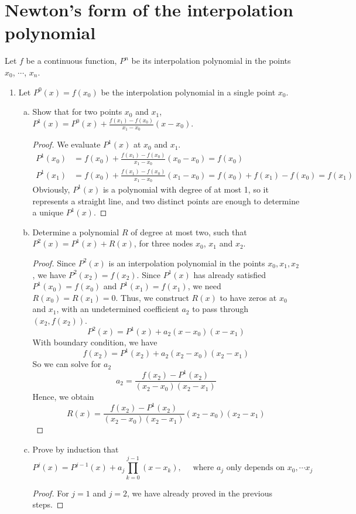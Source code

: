 \section{Newton's form of the interpolation polynomial}
Let \(f\) be a continuous function, \(P^n\) be its interpolation polynomial in the points  \(x_0\), \(\cdots\), \(x_n\).
\begin{enumerate}
	\item Let \(P^0(x)=f(x_0)\) be the interpolation polynomial in a single point $x_0$.
	\begin{enumerate}[(a)]
		\item Show that for two points $x_0$ and $x_1$, \(P^1(x)=P^0(x)+\frac{f(x_1)-f(x_0)}{x_1-x_0}(x-x_0)\).
		\begin{proof}
		We evaluate \(P^1(x)\) at $x_0$ and $x_1$.
		\begin{align*}
		P^1(x_0)&=f(x_0)+\frac{f(x_1)-f(x_0)}{x_1-x_0}(x_0-x_0)=f(x_0)\\
		P^1(x_1)&=f(x_0)+\frac{f(x_1)-f(x_0)}{x_1-x_0}(x_1-x_0)=f(x_0)+f(x_1)-f(x_0)=f(x_1)
		\end{align*}
		Obviously, \(P^1(x)\) is a polynomial with degree of at most 1, so it represents a straight line, and two distinct points are enough to determine a unique \(P^1(x)\).
		\end{proof}
		\item Determine a polynomial $R$ of degree at most two, such that \( P^2(x)=P^1(x)+R(x) \), for three nodes $x_0$, $x_1$ and $x_2$.
		\begin{proof}
		Since \(P^2(x)\) is an interpolation polynomial in the points \(x_0,x_1,x_2\), we have \(P^2(x_2)=f(x_2)\).
		Since \(P^1(x)\) has already satisfied \(P^1(x_0)=f(x_0)\) and \(P^1(x_1)=f(x_1)\), we need \(R(x_0)=R(x_1)=0\).
		Thus, we construct \(R(x)\) to have zeros at $x_0$ and $x_1$, with an undetermined coefficient $a_2$ to pass through \((x_2,f(x_2))\).
		\[ P^2(x)=P^1(x)+a_2(x-x_0)(x-x_1) \]
		With boundary condition, we have
		\[ f(x_2)=P^1(x_2)+a_2(x_2-x_0)(x_2-x_1) \]
		So we can solve for $a_2$
		\[ a_2=\frac{f(x_2)-P^1(x_2)}{(x_2-x_0)(x_2-x_1)} \]
		Hence, we obtain
		\[ R(x)=\frac{f(x_2)-P^1(x_2)}{(x_2-x_0)(x_2-x_1)}(x_2-x_0)(x_2-x_1) \]
		\end{proof}
		\item Prove by induction that
		\[ P^j(x)=P^{j-1}(x)+a_j\prod_{k=0}^{j-1}(x-x_k), \quad \textrm{ where } a_j \textrm{ only depends on } x_0,\cdots x_j \]
		\begin{proof}
		For \(j=1\) and \(j=2\), we have already proved in the previous steps.

\end{proof}
\end{enumerate}
\end{enumerate}
